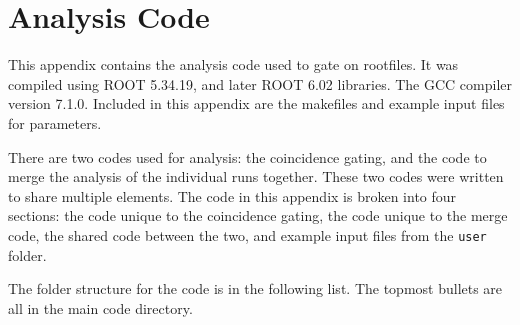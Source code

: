 %
%
%
%
%
%
%
%
%
%


%
%

\chapter{Analysis Code}

This appendix contains the analysis code used to gate on rootfiles. It was compiled using ROOT 5.34.19, and later ROOT 6.02 libraries. The GCC compiler version 7.1.0. Included in this appendix are the makefiles and example input files for parameters.

There are two codes used for analysis: the coincidence gating, and the code to merge the analysis of the individual runs together. These two codes were written to share multiple elements. The code in this appendix is broken into four sections: the code unique to the coincidence gating, the code unique to the merge code, the shared code between the two, and example input files from the \texttt{user} folder.

The folder structure for the code is in the following list. The topmost bullets are all in the main code directory. 

